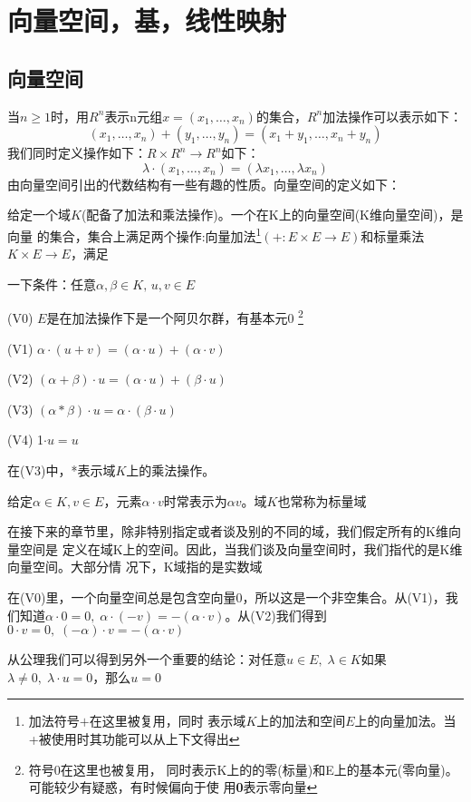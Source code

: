 \chapter{向量空间，基，线性映射}
\section{向量空间}
当$n\ge 1$时，用$R^n$表示n元组$x=(x_1,\ldots ,x_n)$的集合，$R^n$加法操作可以表示如下：
\[
  (x_1,\ldots,x_n)+(y_1,\ldots,y_n)=(x_1+y_1,\ldots,x_n+y_n)
\]
我们同时定义操作如下：$R\times R^n\to R^n$如下：
\[
  \lambda\cdot(x_1,\ldots,x_n) = (\lambda x_1,\ldots,\lambda x_n)
  \]
  由向量空间引出的代数结构有一些有趣的性质。向量空间的定义如下：
\begin{definition}
  给定一个域$K$(配备了加法和乘法操作)。一个在K上的向量空间(K维向量空间)，是向量
  的集合，集合上满足两个操作:向量加法\footnote{加法符号$+$在这里被复用，同时
    表示域$K$上的加法和空间$E$上的向量加法。当+被使用时其功能可以从上下文得出}$(+:E\times E\to E)$和标量乘法$K\times E\to E$，满足

  一下条件：任意$\alpha,\beta\in K,\,u,v\in E$

  (V0) $E$是在加法操作下是一个阿贝尔群，有基本元0 \footnote{符号0在这里也被复用，
    同时表示K上的的零(标量)和E上的基本元(零向量)。可能较少有疑惑，有时候偏向于使
    用\textbf{0}表示零向量}

  (V1) $\alpha \cdot (u+v)=(\alpha\cdot u)+(\alpha\cdot v)$

  (V2) $(\alpha + \beta)\cdot u= (\alpha\cdot u)+(\beta\cdot u)$

  (V3) $(\alpha*\beta)\cdot u=\alpha\cdot(\beta\cdot u)$

  (V4) 1$\cdot u = u$

  在(V3)中，*表示域$K$上的乘法操作。
\end{definition}

给定$\alpha \in  K , v\in E$，元素$\alpha \cdot v$时常表示为$\alpha v$。域$K$也常称为标量域

在接下来的章节里，除非特别指定或者谈及别的不同的域，我们假定所有的K维向量空间是
定义在域K上的空间。因此，当我们谈及向量空间时，我们指代的是K维向量空间。大部分情
况下，K域指的是实数域

在(V0)里，一个向量空间总是包含空向量0，所以这是一个非空集合。从(V1)，我们知道$\alpha
\cdot 0 = 0,\;\alpha\cdot(-v)=-(\alpha\cdot v)$。从(V2)我们得到$0\cdot v = 0,\;(-\alpha)\cdot v=-(\alpha \cdot v)$

从公理我们可以得到另外一个重要的结论：对任意$u \in E,\;\lambda \in K$如果$\lambda \neq 0,\;
\lambda\cdot u = 0$，那么$u=0$

